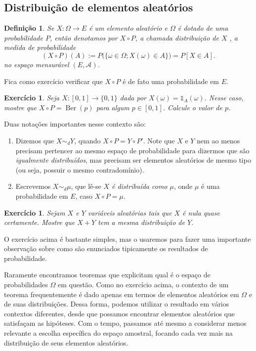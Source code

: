 \documentclass[reqno, final]{book}
\newcommand*\1{\mathds{1}}
\newtheorem{definition}[theorem]{Definição}
\newtheorem{exercise}[example]{Exercício}
\DeclareMathOperator{\Ber}{Ber}
\def \distr{\sim_d}
\begin{document}
\subsection{Distribuição de elementos aleatórios}

\begin{definition}
  Se $X:\Omega \to E$ é um elemento aleatório e $\Omega$ é dotado de uma probabilidade $P$, então denotamos por $X \circ P$, a chamada \emph{distribuição de $X$} , a medida de probabilidade
  \begin{equation}
    (X \circ P)(A) := P\big( \{\omega \in \Omega; X(\omega) \in A\} \big) = P[X \in A].
  \end{equation}
  no espaço mensurável $(E,\mathcal{A})$.
\end{definition}

Fica como exercício verificar que $X \circ P$ é de fato uma probabilidade em $E$.

\begin{exercise}
  Seja $X:[0,1] \to \{0,1\}$ dada por $X(\omega) = \1_A (\omega)$.
  Nesse caso, mostre que $X \circ P = \Ber(p)$ para algum $p \in [0,1]$.
  Calcule o valor de $p$.
\end{exercise}

Duas notações importantes nesse contexto são:
\begin{enumerate}[\quad a)]
\item Dizemos que $X \distr Y$, \index{X d Y@$X \distr Y$} quando $X \circ P = Y \circ P'$.
Note que $X$ e $Y$ nem ao menos precisam pertencer ao mesmo espaço de probabilidade para dizermos que são \emph{igualmente distribuídos}, mas precisam ser elementos aleatórios de mesmo tipo (ou seja, possuir o mesmo contradomínio).
\item Escrevemos $X \distr \mu$, \index{X d mu@$X \distr \mu$} que lê-se \emph{$X$ é distribuída como $\mu$}, onde $\mu$ é uma probabilidade em $E$, caso $X \circ P = \mu$.
\end{enumerate}

\begin{exercise}
  Sejam $X$ e $Y$ variáveis aleatórias tais que $X$ é nula quase certamente.
  Mostre que $X + Y$ tem a mesma distribuição de $Y$.
\end{exercise}

O exercício acima é bastante simples, mas o usaremos para fazer uma importante observação sobre como são enunciados tipicamente os resultados de probabilidade.

Raramente encontramos teoremas que explicitam qual é o espaço de probabilidades $\Omega$ em questão.
Como no exercício acima, o contexto de um teorema frequentemente é dado apenas em termos de elementos aleatórios em $\Omega$ e de suas distribuições.
Dessa forma, podemos utilizar o resultado em vários contextos diferentes, desde que possamos encontrar elementos aleatórios que satisfaçam as hipóteses.
Com o tempo, passamos até mesmo a considerar menos relevante a escolha específica do espaço amostral, focando cada vez mais na distribuição de seus elementos aleatórios.
\end{document}

